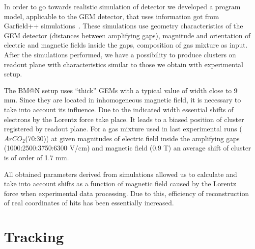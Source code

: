 \documentclass{webofc}
\begin{document}
In order to go towards realistic simulation of detector we developed a program model, applicable to the GEM detector, that uses information got from Garfield++
simulations~\cite{Pfeiffer:2018yam}.
These simulations use geometry characteristics of the GEM detector (distances between amplifying gaps), magnitude and orientation of electric and magnetic fields inside the gaps,
composition of gas mixture  as input. After the simulations performed, we have a possibility to produce clusters on readout plane with characteristics similar to those
we obtain with experimental setup.

The BM@N setup uses ``thick'' GEMs with a typical value of width close to 9 mm. Since they are located in inhomogeneous magnetic field, it is necessary to take into account its
influence. Due to the indicated width essential shifts of electrons by the Lorentz force take place. It leads to a biased position of cluster registered by readout plane.
For a gas mixture used in last experimental runs ($ArCO_{2}$(70:30)) at given magnitudes of electric field inside the amplifying gaps (1000:2500:3750:6300 V/cm) and magnetic field
(0.9 T) an average shift of cluster is of order of 1.7 mm.

All obtained parameters derived from simulations allowed us to calculate and take into account shifts as a function of magnetic field caused by the Lorentz force
when experimental data processing. Due to this, efficiency of reconstruction of real coordinates of hits has been essentially increased.

\section{Tracking}
\label{tracking}
\end{document}
